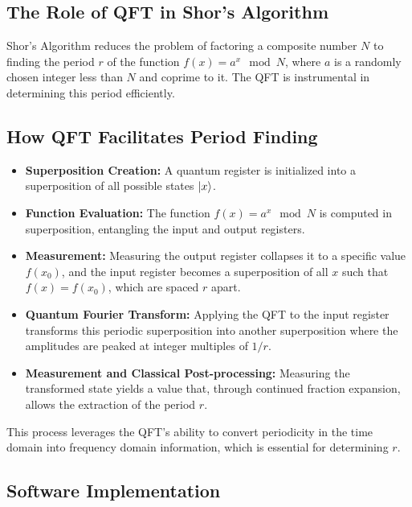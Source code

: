 \documentclass{article}
\begin{document}
\subsection{The Role of QFT in Shor's Algorithm}

Shor's Algorithm reduces the problem of factoring a composite number $N$ to finding the period $r$ of the function $f(x) = a^x \mod N$, where $a$ is a randomly chosen integer less than $N$ and coprime to it. The QFT is instrumental in determining this period efficiently.

\subsection{How QFT Facilitates Period Finding}

\begin{itemize}
    \item \textbf{Superposition Creation:} A quantum register is initialized into a superposition of all possible states $\ket{x}$.
    \item \textbf{Function Evaluation:} The function $f(x) = a^x \mod N$ is computed in superposition, entangling the input and output registers.
    \item \textbf{Measurement:} Measuring the output register collapses it to a specific value $f(x_0)$, and the input register becomes a superposition of all $x$ such that $f(x) = f(x_0)$, which are spaced $r$ apart.
    \item \textbf{Quantum Fourier Transform:} Applying the QFT to the input register transforms this periodic superposition into another superposition where the amplitudes are peaked at integer multiples of $1/r$.
    \item \textbf{Measurement and Classical Post-processing:} Measuring the transformed state yields a value that, through continued fraction expansion, allows the extraction of the period $r$.
\end{itemize}

This process leverages the QFT's ability to convert periodicity in the time domain into frequency domain information, which is essential for determining $r$.

\subsection{Software Implementation}


\end{document}
